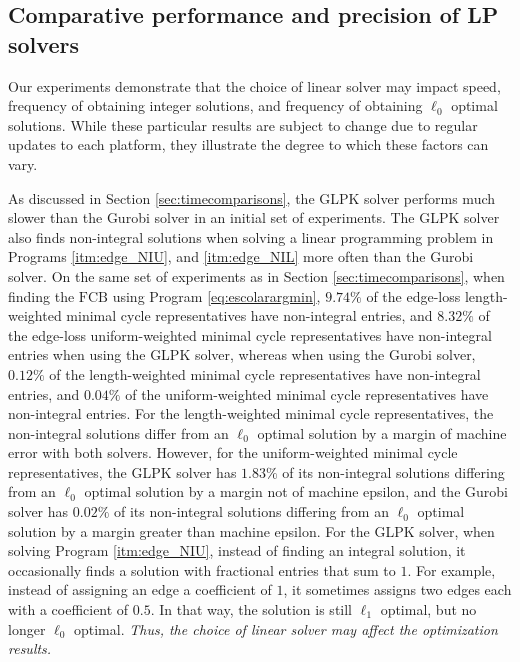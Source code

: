 \documentclass[11pt,onecolumn]{article}
\newcommand{\se}{Section }
\newcommand{\setoffilteredcyclebases}{\mathrm{FCB}}
\newcommand{\pr}{Program }
\theoremstyle{plain}
\theoremstyle{definition}
\begin{document}
 
\subsection{Comparative performance and precision of LP solvers}\label{Computational cost of the various optimization techniques}

Our experiments demonstrate that the choice of linear solver may impact speed, frequency of obtaining integer solutions, and frequency of obtaining $\ell_0$ optimal solutions. While these particular results are subject to change due to regular updates to each platform, they illustrate the degree to which these factors can vary.  

As discussed in \se \ref{sec:timecomparisons}, the GLPK solver performs much slower than the Gurobi solver in an initial set of experiments. The GLPK solver also finds non-integral solutions when solving a linear programming problem in Programs
\ref{itm:edge_NIU}, and
\ref{itm:edge_NIL}
 more often than the Gurobi solver. On the same set of experiments as in \se \ref{sec:timecomparisons}, when finding the $\setoffilteredcyclebases$ using \pr \eqref{eq:escolarargmin}, $9.74\%$ of the edge-loss length-weighted minimal cycle representatives have non-integral entries, and $8.32\%$ of the edge-loss uniform-weighted minimal cycle representatives have non-integral entries when using the GLPK solver, whereas when using the Gurobi solver, $0.12\%$ of the length-weighted minimal cycle representatives have non-integral entries, and $0.04\%$ of the uniform-weighted minimal cycle representatives have non-integral entries. For the length-weighted minimal cycle representatives, the non-integral solutions differ from an $\ell_0$ optimal solution by a margin of machine error with both solvers. However, for the uniform-weighted minimal cycle representatives, the GLPK solver has $1.83\%$ of its non-integral solutions differing from an $\ell_0$ optimal solution by a margin not of machine epsilon, and the Gurobi solver has $0.02\%$ of its non-integral solutions differing from an $\ell_0$ optimal solution by a margin greater than machine epsilon. For the GLPK solver, when solving \pr
 \ref{itm:edge_NIU}, instead of finding an integral solution, it occasionally finds a solution with fractional entries that sum to $1$. For example, instead of assigning an edge a coefficient of $1$, it sometimes assigns two edges each with a coefficient of $0.5$. In that way, the solution is still $\ell_1$ optimal, but no longer $\ell_0$ optimal. \emph{Thus, the choice of linear solver may affect the optimization results.} 
\end{document}
